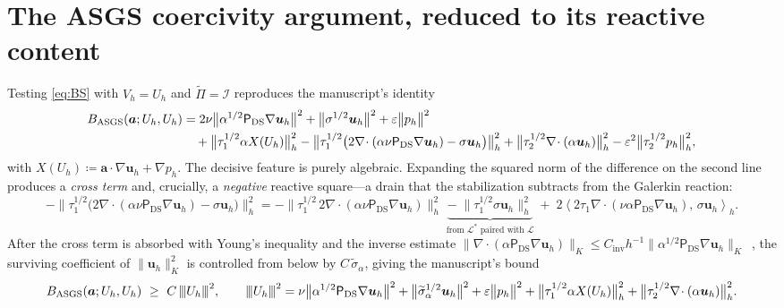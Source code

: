 \documentclass[11pt]{article}
\newcommand{\DSPi}{\mathsf{P}_{\mathrm{DS}}}  %
\newcommand{\triplenorm}[1]{{\lvert\kern-0.25ex\lvert\kern-0.25ex\lvert #1
\rvert\kern-0.25ex\rvert\kern-0.25ex\rvert}}
\newcommand{\dualpairing}[1]{\left\langle #1\right\rangle}
\theoremstyle{plain}
\theoremstyle{remark}
\newcommand{\uh}{\boldsymbol{u}_h}
\newcommand{\ph}{p_h}
\newcommand{\Uh}{U_h}
\newcommand{\Vh}{V_h}
\newcommand{\Porth}{\widetilde{\Pi}}                  %
\newcommand{\siga}{\widetilde{\sigma}_\alpha}
\begin{document}
\section{The ASGS coercivity argument, reduced to its reactive content}
Testing \cref{eq:BS} with $\Vh=\Uh$ and $\Porth=\mathcal{I}$ reproduces the
manuscript's identity
%
\begin{align}\label{eq:ASGS-expand}
  B_{\mathrm{ASGS}}(\boldsymbol{a};\Uh,\Uh)
  &= 2\nu\big\|\alpha^{1/2}\DSPi\nabla\uh\big\|^2
   + \big\|\sigma^{1/2}\uh\big\|^2
   + \varepsilon\big\|\ph\big\|^2 \notag\\
  &\quad
   + \big\|\tau_1^{1/2}\alpha X(\Uh)\big\|_h^2
   - \big\|\tau_1^{1/2}\big(2\nabla\!\cdot(\alpha\nu\DSPi\nabla\uh)-\sigma\uh\big)\big\|_h^2
   + \big\|\tau_2^{1/2}\nabla\!\cdot(\alpha\uh)\big\|_h^2
   - \varepsilon^2\big\|\tau_2^{1/2}\ph\big\|_h^2 ,
\end{align}
%
with $X(\Uh)\coloneqq\boldsymbol{a}\cdot\nabla\uh+\nabla\ph$. The decisive feature
is purely algebraic. Expanding the squared norm of the difference on the second
line produces a \emph{cross term} and, crucially, a \emph{negative} reactive
square---a drain that the stabilization subtracts from the Galerkin reaction:
%
\begin{equation}\label{eq:reactive-drain}
  -\big\|\tau_1^{1/2}\big(2\nabla\!\cdot(\alpha\nu\DSPi\nabla\uh)-\sigma\uh\big)\big\|_h^2
  = -\big\|\tau_1^{1/2}\,2\nabla\!\cdot(\alpha\nu\DSPi\nabla\uh)\big\|_h^2
    \;\underbrace{-\;\big\|\tau_1^{1/2}\sigma\uh\big\|_h^2}_{\text{from }\mathcal{L}^*\text{ paired with }\mathcal{L}}
    \;+\;2\dualpairing{2\tau_1\nabla\!\cdot(\nu\alpha\DSPi\nabla\uh),\,\sigma\uh}_h .
\end{equation}
%
After the cross term is absorbed with Young's inequality and the inverse estimate
$\|\nabla\!\cdot(\alpha\DSPi\nabla\uh)\|_K\le C_\mathrm{inv}h^{-1}
\|\alpha^{1/2}\DSPi\nabla\uh\|_K$~\cite{brenner2008mathematical}, the surviving
coefficient of $\|\uh\|_K^2$ is controlled from below by $C\,\siga$, giving the
manuscript's bound
%
\begin{equation}\label{eq:ASGS-lemma}
  B_{\mathrm{ASGS}}(\boldsymbol{a};\Uh,\Uh)\ \ge\ C\,\triplenorm{\Uh}^2,
  \qquad
  \triplenorm{\Uh}^2
  = \nu\big\|\alpha^{1/2}\DSPi\nabla\uh\big\|^2
  + \big\|\siga^{1/2}\uh\big\|^2
  + \varepsilon\big\|\ph\big\|^2
  + \big\|\tau_1^{1/2}\alpha X(\Uh)\big\|_h^2
  + \big\|\tau_2^{1/2}\nabla\!\cdot(\alpha\uh)\big\|_h^2 .
\end{equation}
\end{document}
